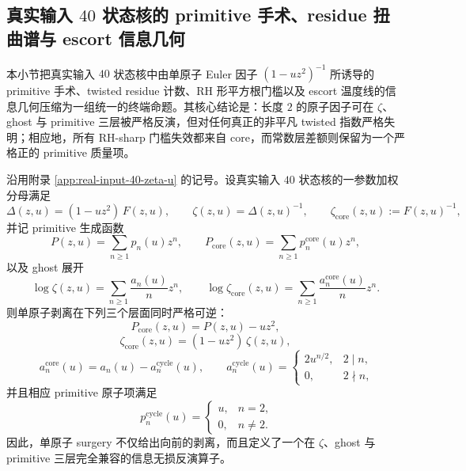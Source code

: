 \subsection{真实输入 \texorpdfstring{$40$}{40} 状态核的 primitive 手术、residue 扭曲谱与 escort 信息几何}\label{subsec:conclusion-realinput40-primitive-surgery-residue-escort-geometry}
本小节把真实输入 \(40\) 状态核中由单原子 Euler 因子 \((1-uz^2)^{-1}\) 所诱导的 primitive 手术、twisted residue 计数、RH 形平方根门槛以及 escort 温度线的信息几何压缩为一组统一的终端命题。其核心结论是：长度 \(2\) 的原子因子可在 \(\zeta\)、ghost 与 primitive 三层被严格反演，但对任何真正的非平凡 twisted 指数严格失明；相应地，所有 RH-sharp 门槛失效都来自 core，而常数层差额则保留为一个严格正的 primitive 质量项。

\begin{theorem}\label{thm:conclusion-realinput40-atomic-surgery-three-level-invertibility}
沿用附录 \ref{app:real-input-40-zeta-u} 的记号。设真实输入 \(40\) 状态核的一参数加权分母满足
\[
\Delta(z,u)=(1-uz^2)\,F(z,u),
\qquad
\zeta(z,u)=\Delta(z,u)^{-1},
\qquad
\zeta_{\mathrm{core}}(z,u):=F(z,u)^{-1},
\]
并记 primitive 生成函数
\[
P(z,u)=\sum_{n\ge 1}p_n(u)z^n,
\qquad
P_{\mathrm{core}}(z,u)=\sum_{n\ge 1}p_n^{\mathrm{core}}(u)z^n,
\]
以及 ghost 展开
\[
\log \zeta(z,u)=\sum_{n\ge 1}\frac{a_n(u)}{n}z^n,
\qquad
\log \zeta_{\mathrm{core}}(z,u)=\sum_{n\ge 1}\frac{a_n^{\mathrm{core}}(u)}{n}z^n.
\]
则单原子剥离在下列三个层面同时严格可逆：
\[
\boxed{\;
P_{\mathrm{core}}(z,u)=P(z,u)-uz^2,\;}
\]
\[
\boxed{\;
\zeta_{\mathrm{core}}(z,u)=(1-uz^2)\,\zeta(z,u),\;}
\]
\[
\boxed{\;
a_n^{\mathrm{core}}(u)=a_n(u)-a_n^{\mathrm{cycle}}(u),\qquad
a_n^{\mathrm{cycle}}(u)=
\begin{cases}
2u^{n/2},&2\mid n,\\
0,&2\nmid n,
\end{cases}}
\]
并且相应 primitive 原子项满足
\[
\boxed{\;
p_n^{\mathrm{cycle}}(u)=
\begin{cases}
u,& n=2,\\
0,& n\neq 2.
\end{cases}}
\]
因此，单原子 surgery 不仅给出向前的剥离，而且定义了一个在 \(\zeta\)、ghost 与 primitive 三层完全兼容的信息无损反演算子。
\end{theorem}

